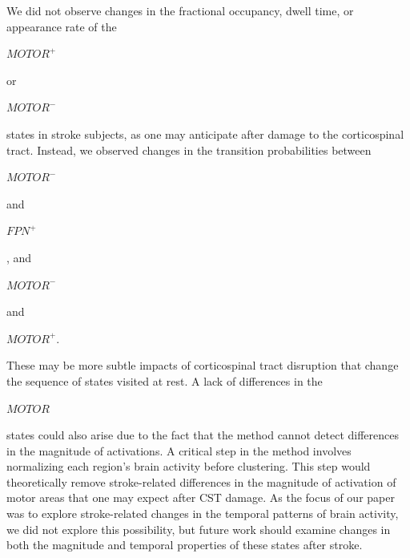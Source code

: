 \documentclass[phd,tocprelim]{cornell}
\begin{document}
    We did not observe changes in the fractional occupancy, dwell time, or appearance rate of the  \begin{Large}$MOTOR^+$ \end{Large} or  \begin{Large}$MOTOR^-$ \end{Large} states in stroke subjects, as one may anticipate after damage to the corticospinal tract. Instead, we observed changes in the transition probabilities between  \begin{Large}$MOTOR^-$ \end{Large} and  \begin{Large}$FPN^+$ \end{Large}, and  \begin{Large}$MOTOR^-$ \end{Large} and  \begin{Large}$MOTOR^+$. \end{Large} These may be more subtle impacts of corticospinal tract disruption that change the sequence of states visited at rest. A lack of differences in the  \begin{Large}$MOTOR$ \end{Large} states could also arise due to the fact that the method cannot detect differences in the magnitude of activations. A critical step in the method involves normalizing each region’s brain activity before clustering. This step would theoretically remove stroke-related differences in the magnitude of activation of motor areas that one may expect after CST damage. As the focus of our paper was to explore stroke-related changes in the temporal patterns of brain activity, we did not explore this possibility, but future work should examine changes in both the magnitude and temporal properties of these states after stroke. 
    
\end{document}
